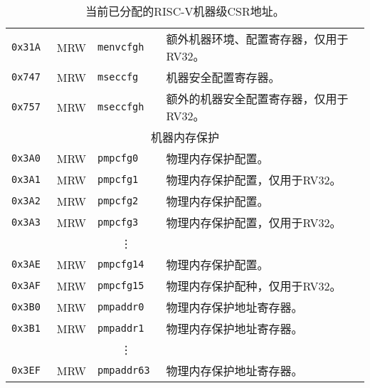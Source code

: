 \begin{table}[htb!]
\begin{center}
\begin{tabular}{|l|l|l|l|}
\tt 0x31A & MRW  &\tt menvcfgh   & 额外机器环境、配置寄存器，仅用于RV32。 \\
\tt 0x747 & MRW  &\tt mseccfg    & 机器安全配置寄存器。 \\
\tt 0x757 & MRW  &\tt mseccfgh   & 额外的机器安全配置寄存器，仅用于RV32。 \\
\hline
\multicolumn{4}{|c|}{机器内存保护} \\
\hline
\tt 0x3A0 & MRW  &\tt pmpcfg0    & 物理内存保护配置。\\
\tt 0x3A1 & MRW  &\tt pmpcfg1    & 物理内存保护配置，仅用于RV32。 \\
\tt 0x3A2 & MRW  &\tt pmpcfg2    & 物理内存保护配置。 \\
\tt 0x3A3 & MRW  &\tt pmpcfg3    & 物理内存保护配置，仅用于RV32。 \\
& & \multicolumn{1}{c|}{\vdots} & \ \\
\tt 0x3AE & MRW  &\tt pmpcfg14   & 物理内存保护配置。 \\
\tt 0x3AF & MRW  &\tt pmpcfg15   & 物理内存保护配种，仅用于RV32。 \\
\tt 0x3B0 & MRW  &\tt pmpaddr0   & 物理内存保护地址寄存器。 \\
\tt 0x3B1 & MRW  &\tt pmpaddr1   & 物理内存保护地址寄存器。 \\
& & \multicolumn{1}{c|}{\vdots} & \ \\
\tt 0x3EF & MRW  &\tt pmpaddr63  & 物理内存保护地址寄存器。 \\
\hline
\end{tabular}
\end{center}
\caption{当前已分配的RISC-V机器级CSR地址。
    }
\label{mcsrnames0}
\end{table}

